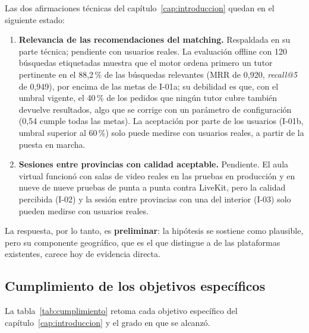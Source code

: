 Las dos afirmaciones técnicas del capítulo~\ref{cap:introduccion} quedan
en el siguiente estado:

\begin{enumerate}
    \item \textbf{Relevancia de las recomendaciones del \gls{matching}.}
          Respaldada en su parte técnica; pendiente con usuarios reales.
          La evaluación offline con 120 búsquedas etiquetadas muestra que
          el motor ordena primero un tutor pertinente en el 88,2\,\% de
          las búsquedas relevantes (MRR de 0,920, \emph{recall@5} de
          0,949), por encima de las metas de I-01a; su debilidad es que,
          con el umbral vigente, el 40\,\% de los pedidos que ningún tutor
          cubre también devuelve resultados, algo que se corrige con un
          parámetro de configuración (0,54 cumple todas las metas). La
          aceptación por parte de los usuarios (I-01b, umbral superior al
          60\,\%) solo puede medirse con usuarios reales, a partir de la
          puesta en marcha.
    \item \textbf{Sesiones entre provincias con calidad aceptable.}
          Pendiente. El aula virtual funcionó con salas de video reales en
          las pruebas en producción y en nueve de nueve pruebas de punta a
          punta contra LiveKit, pero la calidad percibida (I-02) y la
          sesión entre provincias con una del interior (I-03) solo pueden
          medirse con usuarios reales.
\end{enumerate}

La respuesta, por lo tanto, es \textbf{preliminar}: la hipótesis se
sostiene como plausible, pero su componente geográfico, que es el que
distingue a \sistema{} de las plataformas existentes, carece hoy de
evidencia directa.

\subsection{Cumplimiento de los objetivos específicos}

La tabla~\ref{tab:cumplimiento} retoma cada objetivo específico del
capítulo~\ref{cap:introduccion} y el grado en que se alcanzó.

